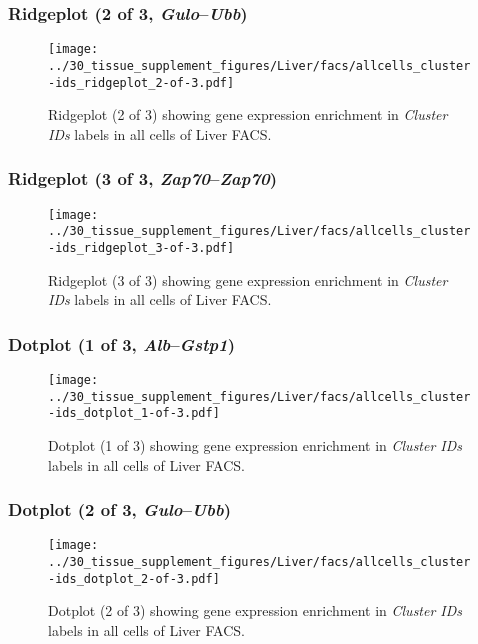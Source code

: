 \clearpage

\subsubsection{Ridgeplot (2 of 3, \emph{Gulo}--\emph{Ubb})}
\begin{figure}[h]
\centering
\texttt{[image: ../30\_tissue\_supplement\_figures/Liver/facs/allcells\_cluster-ids\_ridgeplot\_2-of-3.pdf]}

\caption{ Ridgeplot (2 of 3)  showing gene expression enrichment in \emph{Cluster IDs} labels in all cells of Liver FACS. }
\end{figure}


\clearpage

\subsubsection{Ridgeplot (3 of 3, \emph{Zap70}--\emph{Zap70})}
\begin{figure}[h]
\centering
\texttt{[image: ../30\_tissue\_supplement\_figures/Liver/facs/allcells\_cluster-ids\_ridgeplot\_3-of-3.pdf]}

\caption{ Ridgeplot (3 of 3)  showing gene expression enrichment in \emph{Cluster IDs} labels in all cells of Liver FACS. }
\end{figure}


\clearpage

\subsubsection{Dotplot (1 of 3, \emph{Alb}--\emph{Gstp1})}
\begin{figure}[h]
\centering
\texttt{[image: ../30\_tissue\_supplement\_figures/Liver/facs/allcells\_cluster-ids\_dotplot\_1-of-3.pdf]}

\caption{ Dotplot (1 of 3)  showing gene expression enrichment in \emph{Cluster IDs} labels in all cells of Liver FACS. }
\end{figure}


\clearpage

\subsubsection{Dotplot (2 of 3, \emph{Gulo}--\emph{Ubb})}
\begin{figure}[h]
\centering
\texttt{[image: ../30\_tissue\_supplement\_figures/Liver/facs/allcells\_cluster-ids\_dotplot\_2-of-3.pdf]}

\caption{ Dotplot (2 of 3)  showing gene expression enrichment in \emph{Cluster IDs} labels in all cells of Liver FACS. }
\end{figure}


